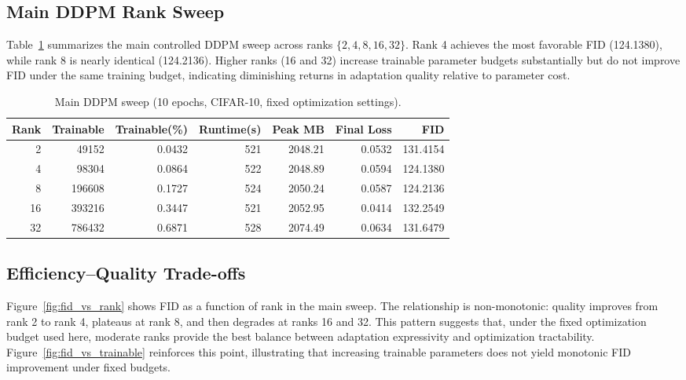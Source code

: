 \documentclass[pdflatex,sn-mathphys-num]{Springer_format/sn-jnl}
\begin{document}
  \subsection{Main DDPM Rank Sweep}
  \label{sec:main_results}
  
  Table~\ref{tab:main_ddpm} summarizes the main controlled DDPM sweep across ranks
  $\{2, 4, 8, 16, 32\}$. Rank 4 achieves the most favorable FID (\num{124.1380}), while
  rank 8 is nearly identical (\num{124.2136}). Higher ranks (16 and 32) increase trainable
  parameter budgets substantially but do not improve FID under the same training budget,
  indicating diminishing returns in adaptation quality relative to parameter cost.
  
  \begin{table}[t]
    \centering
    \caption{Main DDPM sweep (10 epochs, CIFAR-10, fixed optimization settings).}
    \label{tab:main_ddpm}
    \small
    \begin{tabular}{rrrrrrr}
      \toprule
      Rank & Trainable & Trainable(\%) & Runtime(s) & Peak MB & Final Loss & FID \\
      \midrule
      2  & 49152  & 0.0432 & 521 & 2048.21 & 0.0532 & 131.4154 \\
      4  & 98304  & 0.0864 & 522 & 2048.89 & 0.0594 & 124.1380 \\
      8  & 196608 & 0.1727 & 524 & 2050.24 & 0.0587 & 124.2136 \\
      16 & 393216 & 0.3447 & 521 & 2052.95 & 0.0414 & 132.2549 \\
      32 & 786432 & 0.6871 & 528 & 2074.49 & 0.0634 & 131.6479 \\
      \bottomrule
    \end{tabular}
  \end{table}
  
  \subsection{Efficiency--Quality Trade-offs}
  \label{sec:efficiency}
  
  Figure~\ref{fig:fid_vs_rank} shows FID as a function of rank in the main sweep. The
  relationship is non-monotonic: quality improves from rank 2 to rank 4, plateaus at rank 8,
  and then degrades at ranks 16 and 32. This pattern suggests that, under the fixed
  optimization budget used here, moderate ranks provide the best balance between adaptation
  expressivity and optimization tractability. Figure~\ref{fig:fid_vs_trainable} reinforces
  this point, illustrating that increasing trainable parameters does not yield monotonic FID
  improvement under fixed budgets.
  
\end{document}

